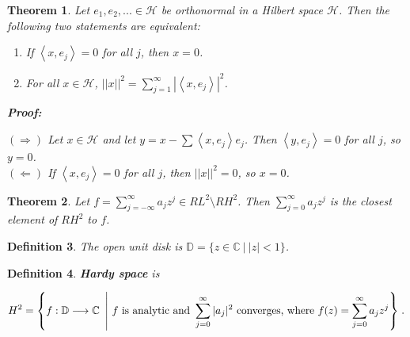 \documentclass{article}
\theoremstyle{colontheorem}
\newtheorem{theorem}{Theorem}[section]
\newtheorem{definition}[theorem]{Definition}
\newenvironment{Theorem}
{
	\begin{mdframed}[backgroundcolor=TheoremOrange!10]
	\begin{theorem}
}
{
	\end{theorem}
	\end{mdframed}
	
	\vspace{.15in}
}
\newenvironment{Def}
{
	\begin{mdframed}[backgroundcolor=DefGreen!10]
	\begin{definition}
}
{
	\end{definition}
	\end{mdframed}
	
	\vspace{.15in}
}
\newenvironment{Proof}
{
	\begin{mdframed}[backgroundcolor=ProofPurple!10]
	\textbf{Proof:}%
}
{
	\end{mdframed}
	
	\vspace{.085in}
}
\begin{document}
\begin{Theorem}
	
	Let $e_1, e_2, ... \in \mathcal{H}$ be orthonormal in a Hilbert space $\mathcal{H}$. Then the following two statements are equivalent:
	
	\begin{enumerate}
		
		\item If $\left< x, e_j \right> = 0$ for all $j$, then $x = 0$.
		
		\item For all $x \in \mathcal{H}$, $||x||^2 = \displaystyle\sum\limits_{j = 1}^\infty | \left< x, e_j \right> |^2$.
		
	\end{enumerate}
	
	\begin{Proof}
		$(\Rightarrow)$ Let $x \in \mathcal{H}$ and let $y = x - \displaystyle\sum \left< x, e_j \right> e_j$. Then $\left< y , e_j \right> = 0$ for all $j$, so $y = 0$.\\
		
		$(\Leftarrow)$ If $\left< x, e_j \right> = 0$ for all $j$, then $||x||^2 = 0$, so $x = 0$.
		
	\end{Proof}
	
\end{Theorem}



\begin{Theorem}
	
	Let $f = \displaystyle\sum\limits_{j = -\infty}^\infty a_j z^j \in RL^2 \setminus RH^2$. Then $\displaystyle\sum\limits_{j = 0}^\infty a_j z^j$ is the closest element of $RH^2$ to $f$.
	
\end{Theorem}



\begin{Def}
	
	The open unit disk is $\mathbb{D} = \{z \in \mathbb{C}\ |\ |z| < 1\}$.
	
\end{Def}



\begin{Def}
	
	\textbf{Hardy space} is
	
	$$
		H^2 = \left\{ f : \mathbb{D} \longrightarrow \mathbb{C}\ \left|\ f \textnormal{ is analytic and } \displaystyle\sum\limits_{j = 0}^\infty |a_j|^2 \textnormal{ converges, where } f(z) = \displaystyle\sum\limits_{j = 0}^\infty a_j z^j \right\} \right. .
	$$
	
\end{Def}
\end{document}
